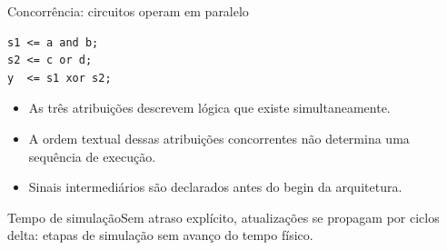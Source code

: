 \begin{frame}[fragile,t]{Concorrência: circuitos operam em paralelo}
\begin{lstlisting}
s1 <= a and b;
s2 <= c or d;
y  <= s1 xor s2;
\end{lstlisting}\begin{itemize}
\item As três atribuições descrevem lógica que existe simultaneamente.
\item A ordem textual dessas atribuições concorrentes não determina uma sequência de execução.
\item Sinais intermediários são declarados antes do begin da arquitetura.
\end{itemize}\begin{block}{Tempo de simulação}Sem atraso explícito, atualizações se propagam por ciclos delta: etapas de simulação sem avanço do tempo físico.\end{block}
\end{frame}

